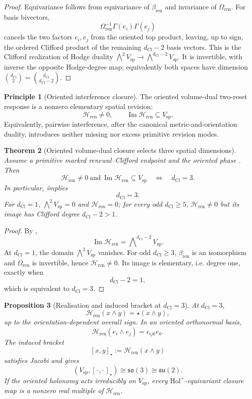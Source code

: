 \documentclass[11pt]{article}
\newtheorem{theorem}{Theorem}[section]
\newtheorem{proposition}[theorem]{Proposition}
\theoremstyle{definition}
\newtheorem{principle}[theorem]{Principle}
\theoremstyle{remark}
\newcommand{\dCl}{d_{\mathrm{Cl}}}
\newcommand{\Vsp}{V_{\mathrm{sp}}}
\newcommand{\Holp}{\mathrm{Hol}^{+}}
\newcommand{\Img}{\operatorname{Im}}
\newcommand{\Volr}{\Omega_{\mathrm{ren}}}
\newcommand{\Hren}{\mathcal{H}_{\mathrm{ren}}}
\newcommand{\bren}{\beta_{\mathrm{ren}}}
\begin{document}
\begin{proof}
Equivariance follows from equivariance of \(\bren\) and invariance of \(\Volr\).
For basis bivectors,
\[
  \Volr^{-1}\Gamma(e_i)\Gamma(e_j)
\]
cancels the two factors \(e_i,e_j\) from the oriented top product, leaving, up
to sign, the ordered Clifford product of the remaining \(\dCl-2\) basis
vectors. This is the Clifford realization of Hodge duality
\(\bigwedge^2\Vsp\to\bigwedge^{\dCl-2}\Vsp\). It is invertible, with inverse the
opposite Hodge-degree map; equivalently both spaces have dimension
\(\binom{\dCl}{2}=\binom{\dCl}{\dCl-2}\).
\end{proof}

\begin{principle}[Oriented interference closure]
\label{prin:interference-closure}
The oriented volume-dual two-reset response is a nonzero elementary spatial
revision:
\[
  \Hren\ne0,
  \qquad
  \Img\Hren\subseteq\Vsp.
\]
Equivalently, pairwise interference, after the canonical metric-and-orientation
duality, introduces neither missing nor excess primitive revision modes.
\end{principle}

\begin{theorem}[Oriented volume-dual closure selects three spatial dimensions]
\label{thm:interference-closure-selects-three}
Assume a primitive marked renewal--Clifford endpoint and the oriented phase
. Then
\[
  \Hren\ne0\ \text{and}\ \Img\Hren\subseteq\Vsp
  \quad\Longleftrightarrow\quad
  \dCl=3.
\]
In particular,  implies
\[
  \boxed{\dCl=3}.
\]
For \(\dCl=1\), \(\bigwedge^2\Vsp=0\) and \(\Hren=0\); for every odd
\(\dCl\ge5\), \(\Hren\ne0\) but its image has Clifford degree
\(\dCl-2>1\).
\end{theorem}

\begin{proof}
By ,
\[
  \Img\Hren=\bigwedge\nolimits^{\dCl-2}\Vsp.
\]
At \(\dCl=1\), the domain \(\bigwedge^2\Vsp\) vanishes. For odd
\(\dCl\ge3\), \(\bren\) is an isomorphism and \(\Volr\) is invertible, hence
\(\Hren\ne0\). Its image is elementary, i.e. degree one, exactly when
\[
  \dCl-2=1,
\]
which is equivalent to \(\dCl=3\).
\end{proof}

\begin{proposition}[Realisation and induced bracket at \(\dCl=3\)]
\label{prop:hodge-interference-closure}
At \(\dCl=3\),
\[
  \Hren(x\wedge y)=\star(x\wedge y),
\]
up to the orientation-dependent overall sign. In an oriented orthonormal basis,
\[
  \Hren(e_i\wedge e_j)=\epsilon_{ijk}e_k.
\]
The induced bracket
\[
  [x,y]_\star:=\Hren(x\wedge y)
\]
satisfies Jacobi and gives
\[
  (\Vsp,[\,\cdot,\cdot\,]_\star)
  \cong\mathfrak{so}(3)\cong\mathfrak{su}(2).
\]
If the oriented holonomy acts irreducibly on \(\Vsp\), every
\(\Holp\)-equivariant closure map is a nonzero real multiple of \(\Hren\).
\end{proposition}
\end{document}
